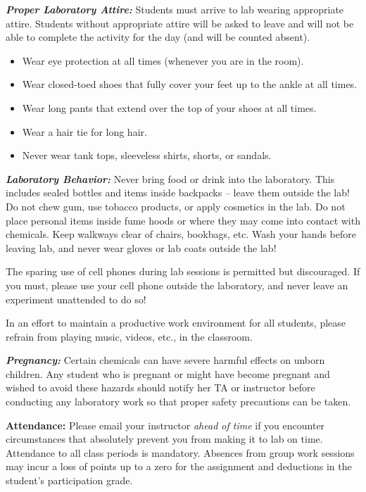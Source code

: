 \documentclass[]{tufte-book}
\providecommand{\tightlist}{%
  \setlength{\itemsep}{0pt}\setlength{\parskip}{0pt}}
\begin{document}
\textbf{\emph{Proper Laboratory Attire:}} Students must arrive to lab wearing appropriate attire. Students without appropriate attire will be asked to leave and will not be able to complete the activity for the day (and will be counted absent).

\begin{itemize}
\tightlist
\item
  Wear eye protection at all times (whenever you are in the room).\\
\item
  Wear closed-toed shoes that fully cover your feet up to the ankle at all times.\\
\item
  Wear long pants that extend over the top of your shoes at all times.\\
\item
  Wear a hair tie for long hair.\\
\item
  Never wear tank tops, sleeveless shirts, shorts, or sandals.
\end{itemize}

\textbf{\emph{Laboratory Behavior:}} Never bring food or drink into the laboratory. This includes sealed bottles and items inside backpacks -- leave them outside the lab! Do not chew gum, use tobacco products, or apply cosmetics in the lab. Do not place personal items inside fume hoods or where they may come into contact with chemicals. Keep walkways clear of chairs, bookbags, etc. Wash your hands before leaving lab, and never wear gloves or lab coats outside the lab!

The sparing use of cell phones during lab sessions is permitted but discouraged. If you must, please use your cell phone outside the laboratory, and never leave an experiment unattended to do so!

In an effort to maintain a productive work environment for all students, please refrain from playing music, videos, etc., in the classroom.

\textbf{\emph{Pregnancy:}} Certain chemicals can have severe harmful effects on unborn children. Any student who is pregnant or might have become pregnant and wished to avoid these hazards should notify her TA or instructor before conducting any laboratory work so that proper safety precautions can be taken.

\textbf{Attendance:} Please email your instructor \emph{ahead of time} if you encounter circumstances that absolutely prevent you from making it to lab on time. Attendance to all class periods is mandatory. Absences from group work sessions may incur a loss of points up to a zero for the assignment and deductions in the student's participation grade.
\end{document}
